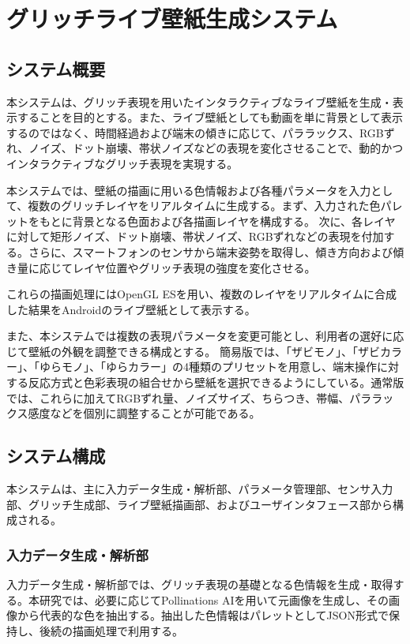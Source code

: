 \chapter{グリッチライブ壁紙生成システム}

\section{システム概要}

本システムは、グリッチ表現を用いたインタラクティブなライブ壁紙を生成・表示することを目的とする。また、ライブ壁紙としても動画を単に背景として表示するのではなく、時間経過および端末の傾きに応じて、パララックス、RGBずれ、ノイズ、ドット崩壊、帯状ノイズなどの表現を変化させることで、動的かつインタラクティブなグリッチ表現を実現する。

本システムでは、壁紙の描画に用いる色情報および各種パラメータを入力として、複数のグリッチレイヤをリアルタイムに生成する。まず、入力された色パレットをもとに背景となる色面および各描画レイヤを構成する。
次に、各レイヤに対して矩形ノイズ、ドット崩壊、帯状ノイズ、RGBずれなどの表現を付加する。さらに、スマートフォンのセンサから端末姿勢を取得し、傾き方向および傾き量に応じてレイヤ位置やグリッチ表現の強度を変化させる。

これらの描画処理にはOpenGL ESを用い、複数のレイヤをリアルタイムに合成した結果をAndroidのライブ壁紙として表示する。

また、本システムでは複数の表現パラメータを変更可能とし、利用者の選好に応じて壁紙の外観を調整できる構成とする。
簡易版では、「ザビモノ」、「ザビカラー」、「ゆらモノ」、「ゆらカラー」の4種類のプリセットを用意し、端末操作に対する反応方式と色彩表現の組合せから壁紙を選択できるようにしている。通常版では、これらに加えてRGBずれ量、ノイズサイズ、ちらつき、帯幅、パララックス感度などを個別に調整することが可能である。


\section{システム構成}

本システムは、主に入力データ生成・解析部、パラメータ管理部、センサ入力部、グリッチ生成部、ライブ壁紙描画部、およびユーザインタフェース部から構成される。


\subsection{入力データ生成・解析部}

入力データ生成・解析部では、グリッチ表現の基礎となる色情報を生成・取得する。本研究では、必要に応じてPollinations AIを用いて元画像を生成し、その画像から代表的な色を抽出する。抽出した色情報はパレットとしてJSON形式で保持し、後続の描画処理で利用する。

